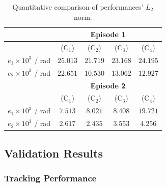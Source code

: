 \documentclass[lettersize,journal]{IEEEtran}
\begin{document}
\begin{table}[!t]
    \renewcommand{\arraystretch}{1.3}
    \caption{Quantitative comparison of performances' $L_2$ norm.}
    \centering
    \begin{tabular}{c c c c c}
    \hline
		& \multicolumn{4}{c}{\textbf{Episode 1}} \\
    \hline
	\hline 
		& (C$_1$) & (C$_2$) & (C$_3$) & (C$_4$) \\
	\hline
		$e_1\times10^{3}$ / rad & $25.013$ & $21.719$ & $23.168$ & $24.195$ \\
	\hline
        $e_2\times10^{3}$ / rad & $22.651$ & $10.530$ & $13.062$ & $12.927$ \\
	\hline
        & \multicolumn{4}{c}{\textbf{Episode 2}} \\
    \hline
    \hline
        & (C$_1$) & (C$_2$) & (C$_3$) & (C$_4$) \\
	\hline
		$e_1\times10^{3}$ / rad & $7.513$ & $8.021$ & $8.408$ & $19.721$ \\
	\hline
        $e_2\times10^{3}$ / rad & $2.617$ & $2.435$ & $3.553$ & $4.256$ \\
    \hline
    \end{tabular}
    \label{tab:sim:L2}
\end{table}

\subsection{Validation Results}

\subsubsection{Tracking Performance}
\end{document}
